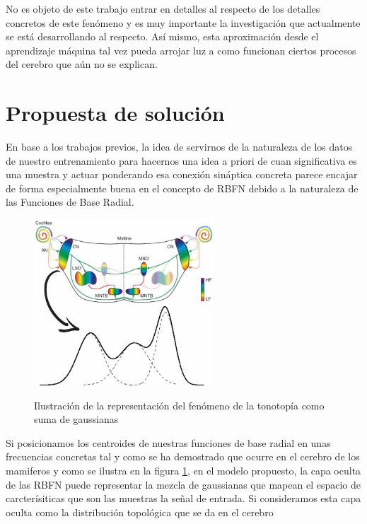 \documentclass[10pt,a4paper]{report}
\begin{document}
No es objeto de este trabajo entrar en detalles al respecto de los detalles concretos de este fenómeno y es muy importante la investigación que actualmente se está desarrollando al respecto. Así mismo, esta aproximación desde el aprendizaje máquina tal vez pueda arrojar luz a como funcionan ciertos procesos del cerebro que aún no se explican.

\section{Propuesta de solución}
En base a los trabajos previos, la idea de servirnos de la naturaleza de los datos de nuestro entrenamiento para hacernos una idea a priori de cuan significativa es una muestra y actuar ponderando esa conexión sináptica concreta parece encajar de forma especialmente buena en el concepto de RBFN debido a la naturaleza de las Funciones de Base Radial. 

\begin{figure}[hb!]{}
    \centering
    \includegraphics[width=0.6\textwidth]{img/esquemaPropuesta1.jpg}
    \label{fig:Esquemapropuesta1}
    \caption{Ilustración de la representación del fenómeno de la tonotopía como suma de gaussianas}
\end{figure}

Si posicionamos los centroides de nuestras funciones de base radial en unas frecuencias concretas tal y como se ha demostrado que ocurre en el cerebro de los mamiferos y como se ilustra en la figura \ref{fig:Esquemapropuesta1}, en el modelo propuesto, la capa oculta de las RBFN puede representar la mezcla de gaussianas que mapean el espacio de carcterísiticas que son las muestras la señal de entrada. Si consideramos esta capa oculta como la distribución topológica que se da en el cerebro
\end{document}
